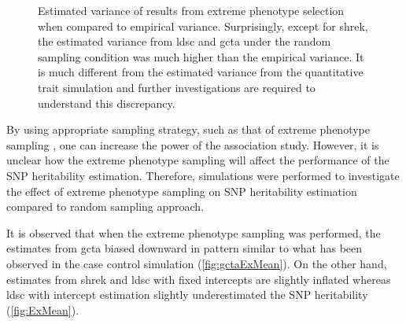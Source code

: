 \begin{figure}
{					
					\label{fig:ldscInExVarCom}
				}
				\caption[Estimation of Variance in Extreme Phenotype Selection]
				{Estimated variance of results from extreme phenotype selection when compared to empirical variance.
					Surprisingly, except for \gls{shrek}, the estimated variance from \gls{ldsc} and \gls{gcta} under the random sampling condition was much higher than the empirical variance. 
					It is much different from the estimated variance from the quantitative trait simulation and further investigations are required to understand this discrepancy.
				} 
				\label{fig:ExVarCom}
			\end{figure}
			
		By using appropriate sampling strategy, such as that of extreme phenotype sampling \citep{Peloso2015}, one can increase the power of the association study.
		However, it is unclear how the extreme phenotype sampling will affect the performance of the \gls{SNP} heritability estimation.
		Therefore, simulations were performed to investigate the effect of extreme phenotype sampling on \gls{SNP} heritability estimation compared to random sampling approach. 
		
		It is observed that when the extreme phenotype sampling was performed, the estimates from \gls{gcta} biased downward in pattern similar to what has been observed in the case control simulation (\cref{fig:gctaExMean}).
		On the other hand, estimates from \gls{shrek} and \gls{ldsc} with fixed intercepts are slightly inflated whereas \gls{ldsc} with intercept estimation slightly underestimated the \gls{SNP} heritability (\cref{fig:ExMean}).
		
